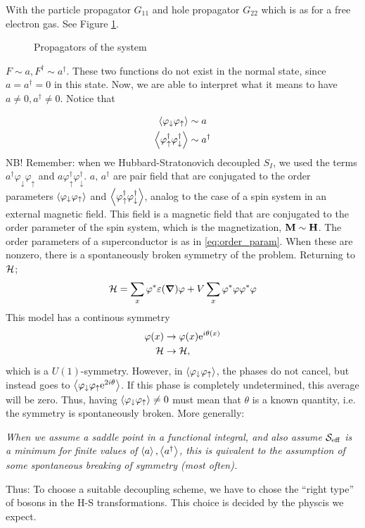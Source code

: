 With the particle propagator $G_{11}$ and hole propagator $G_{22}$ which is as for a free electron gas. See Figure \ref{fig:propagators}.
\begin{figure}
	\centering
	
	\caption{Propagators of the system}
	\label{fig:propagators}
\end{figure}
$F\sim a, F^\dagger \sim a^\dagger $.
These two functions do not exist in the normal state, since $a = a^\dagger = 0$ in this state. Now, we are able to interpret what it means to have $a \ne 0, a^\dagger \ne 0$.
Notice that 

\begin{align}
\label{eq:order_param}
\begin{split}
\ev{\varphi_\downarrow\varphi_\uparrow} &\sim a\\
\ev{\varphi_\uparrow^\dagger\varphi_\downarrow^\dagger} &\sim a^\dagger
\end{split}
\end{align}
NB! Remember: when we Hubbard-Stratonovich decoupled $S_I$, we used the terms $a^\dagger \varphi_\downarrow\varphi_\uparrow$ and $a\varphi_\uparrow^\dagger\varphi_\downarrow^\dagger$. $a,\, a^\dagger$ are pair field that are conjugated to the order parameters $\ev{\varphi_\downarrow\varphi_\uparrow}$ and $\ev{\varphi_\uparrow^\dagger\varphi_\downarrow^\dagger}$, analog to the case of a spin system in an external magnetic field. This field is a magnetic field that are conjugated to the order parameter of the spin system, which is the magnetization, $\vb{M} \sim \vb{H}$.
The order parameters of a superconductor is as in \eqref{eq:order_param}. When these are nonzero, there is a spontaneously broken symmetry of the problem. 
Returning to $\mathcal{H}$;
\begin{equation}
	\mathcal{H} = \sum_x\varphi^*\varepsilon(\grad)\varphi + V\sum_x\varphi^*\varphi\varphi^*\varphi
\end{equation}
This model has a continous symmetry
\begin{align*}
	\varphi(x) &\rightarrow \varphi(x)\mathrm{e}^{i\theta(x)} \\
	\mathcal{H} &\rightarrow \mathcal{H},
\end{align*}
 which is a $U(1)$-symmetry. However, in $\ev{\varphi_\downarrow\varphi_\uparrow}$, the phases do not cancel, but instead goes to $\ev{\varphi_\downarrow\varphi_\uparrow\e^{2i\theta}}$. If this phase is completely undetermined, this average will be zero. Thus, having $\ev{\varphi_\downarrow\varphi_\uparrow}\ne 0$ must mean that $\theta$ is a known quantity, i.e. the symmetry is spontaneously broken. 
 More generally:
 
 \textit{When we assume a saddle point in a functional integral, and also assume $\mathcal{S}_\text{eff}$ is a minimum for finite values of $\ev{a}, \ev{a^\dagger}$, this is quivalent to the assumption of some spontaneous breaking of symmetry (most often).}
 
 Thus: To choose a suitable decoupling scheme, we have to chose the ``right type'' of bosons in the H-S transformations. This choice is decided by the physcis we expect. 
